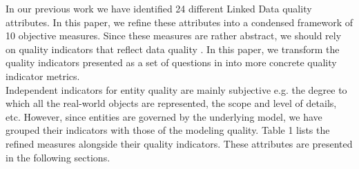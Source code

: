 \documentclass[onecolumn, crcready]{iosart2c}
\begin{document}
In our previous work \cite{assaf2012} we have identified 24 different Linked Data quality attributes. In this paper, we refine these attributes into a condensed framework of 10 objective measures. Since these measures are rather abstract, we should rely on quality indicators that reflect data quality \cite{flemming2010}. In this paper, we transform the quality indicators presented as a set of questions in \cite{assaf2012} into more concrete quality indicator metrics.\\
Independent indicators for entity quality are mainly subjective e.g. the degree to which all the real-world objects are represented, the scope and level of details, etc. However, since entities are governed by the underlying model, we have grouped their indicators with those of the modeling quality. Table 1 lists the refined measures alongside their quality indicators. These attributes are presented in the following sections. \\
\end{document}
